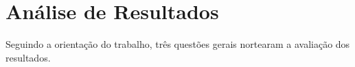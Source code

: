 \section{Análise de Resultados}

Seguindo a orientação do trabalho,
três questões gerais nortearam a avaliação dos resultados.






